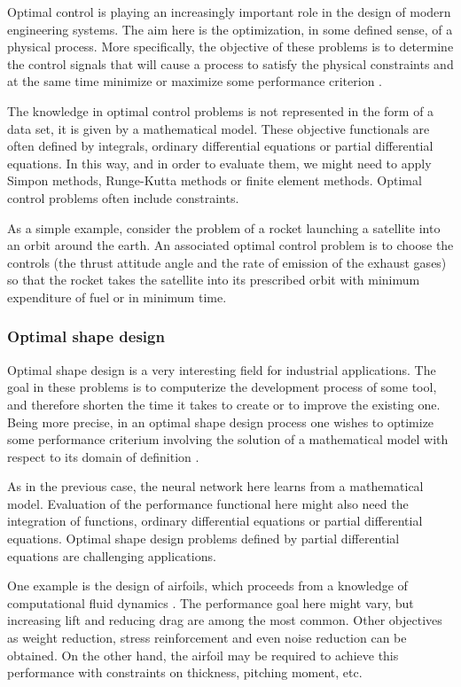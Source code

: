 Optimal control is playing an increasingly important role in the
design of modern engineering systems. The aim
here is the optimization, in some defined sense, of a physical
process. More specifically, the objective of these problems is to
determine the control signals that will cause a process to satisfy
the physical constraints and at the same time minimize or maximize
some performance criterion \cite{Kirk1970} \cite{BalsaCanto2001}. 

The knowledge in optimal control problems is not represented in the form of a data set, it is given by a mathematical model. 
These objective functionals are often defined by integrals, ordinary differential equations or partial differential equations. 
In this way, and in order to evaluate them, we might need to apply Simpon methods, Runge-Kutta methods or finite element methods. 
Optimal control problems often include constraints. 

As a simple example, consider the problem of a rocket launching a
satellite into an orbit around the earth. An associated optimal
control problem is to choose the controls (the thrust attitude angle
and the rate of emission of the exhaust gases) so that the rocket
takes the satellite into its prescribed orbit with minimum
expenditure of fuel or in minimum time.

\subsubsection{Optimal shape design}

Optimal shape design is a very interesting field for industrial
applications. The goal in these problems
is to computerize the development process of some tool, and
therefore shorten the time it takes to create or to improve the
existing one. Being more precise, in an optimal shape design process
one wishes to optimize some performance criterium involving the
solution of a mathematical model with respect to its domain of
definition \cite{Bucur2005}. 

As in the previous case, the neural network here learns from a mathematical model. 
Evaluation of the performance functional here might also need the integration of functions, ordinary differential equations or partial differential equations. 
Optimal shape design problems defined by partial differential equations are challenging applications. 

One example is the design of airfoils,
which proceeds from a knowledge of computational fluid dynamics
\cite{Eyi1994} \cite{Mohammadi2004}. The performance goal here might
vary, but increasing lift and reducing drag are among the most common. Other objectives as weight reduction, stress reinforcement and
even noise reduction can be obtained. On the other hand, the airfoil
may be required to achieve this performance with constraints on
thickness, pitching moment, etc.


